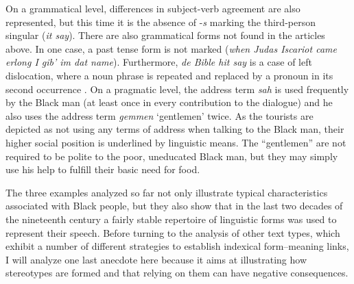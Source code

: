 On a grammatical level, differences in subject-verb agreement are also represented, but this time it is the absence of -\emph{s} marking the third-person singular (\emph{it say}). There are also grammatical forms not found in the articles above. In one case, a past tense form is not marked (\emph{when Judas Iscariot came erlong I gib’ im dat name}). Furthermore, \emph{de Bible hit say} is a case of left dislocation, where a noun phrase is repeated and replaced by a pronoun in its second occurrence \citep[196]{Schneider2015}. On a pragmatic level, the address term \emph{sah} is used frequently by the Black man (at least once in every contribution to the dialogue) and he also uses the address term \emph{gemmen} ‘gentlemen’ twice. As the tourists are depicted as not using any terms of address when talking to the Black man, their higher social position is underlined by linguistic means. The “gentlemen” are not required to be polite to the poor, uneducated Black man, but they may simply use his help to fulfill their basic need for food.

The three examples analyzed so far not only illustrate typical characteristics associated with Black people, but they also show that in the last two decades of the nineteenth century a fairly stable repertoire of linguistic forms was used to represent their speech. Before turning to the analysis of other text types, which exhibit a number of different strategies to establish indexical form–meaning links, I will analyze one last anecdote here because it aims at illustrating how stereotypes are formed and that relying on them can have negative consequences.

